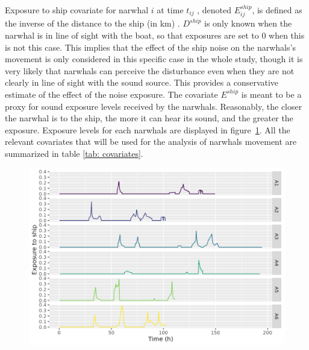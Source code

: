 \documentclass[11pt]{article}
\newcommand {\1}{\mathbb{1}}
\begin{document}
Exposure to ship covariate for narwhal $i$ at time $t_{ij}$ , denoted $E^{ship}_{ij}$, is defined as the inverse of the distance to the ship (in km) \cite{heide-jorgensen_behavioral_2021}.
$D^{ship}$ is only known when the narwhal is in line of sight with the boat, so that exposures are set to $0$ when this is not this case. This implies that the effect of the ship noise on the narwhals's movement is only considered in this specific case in the whole study, though it is very likely that narwhals can perceive the disturbance even when they are not clearly in line of sight with the sound source. This provides a conservative estimate of the effect of the noise exposure. The covariate $E^{ship}$ is meant to be a proxy for sound exposure levels received by the narwhals. Reasonably, the closer the narwhal is to the ship, the more it can hear its sound, and the greater the exposure. Exposure levels for each narwhals are displayed in figure~\ref{fig: realexpthroughtime}. All the relevant covariates that will be used for the analysis of narwhals movement are summarized in table \ref{tab: covariates}.


\begin{figure}[H]
	\centering
	\includegraphics[width=0.7\linewidth]{images/data_exploration/realExp_through_time}
	\caption{}
	\label{fig: realexpthroughtime}
\end{figure}
\end{document}
